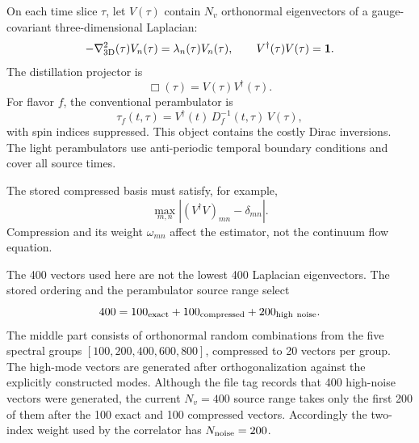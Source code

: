 \documentclass[11pt]{article}
\numberwithin{equation}{section}
\begin{document}
On each time slice \(\tau\), let \(V(\tau)\) contain \(N_v\) orthonormal
eigenvectors of a gauge-covariant three-dimensional Laplacian:
\begin{equation}
  -\nabla_{\rm 3D}^2(\tau)V_n(\tau)
  =
  \lambda_n(\tau)V_n(\tau),
  \qquad
  V^\dagger(\tau)V(\tau)=\mathbf 1.
  \label{eq:laph}
\end{equation}
The distillation projector is
\begin{equation}
  \Box(\tau)=V(\tau)V^\dagger(\tau).
\end{equation}
For flavor \(f\), the conventional perambulator is
\begin{equation}
  \tau_f(t,\tau)
  =
  V^\dagger(t)\,D_f^{-1}(t,\tau)\,V(\tau),
  \label{eq:perambulator}
\end{equation}
with spin indices suppressed. This object contains the costly Dirac
inversions. The light perambulators use anti-periodic temporal boundary
conditions and cover all source times.

The stored compressed basis must satisfy, for example,
\begin{equation}
  \max_{m,n}\left|
  (V^\dagger V)_{mn}-\delta_{mn}
  \right|.
\end{equation}
Compression and its weight \(\omega_{mn}\) affect the estimator, not the
continuum flow equation.

The 400 vectors used here are not the lowest 400 Laplacian eigenvectors.  The
stored ordering and the perambulator source range select
\begin{equation}
  400=100_{\rm exact}+100_{\rm compressed}+200_{\rm high\ noise}.
  \label{eq:stochastic-basis-content}
\end{equation}
The middle part consists of orthonormal random combinations from the five
spectral groups
\([100,200,400,600,800]\), compressed to 20 vectors per group.  The high-mode
vectors are generated after orthogonalization against the explicitly
constructed modes.  Although the file tag records that 400 high-noise vectors
were generated, the current \(N_v=400\) source range takes only the first 200
of them after the 100 exact and 100 compressed vectors.  Accordingly the
two-index weight used by the correlator has \(N_{\rm noise}=200\).
\end{document}
